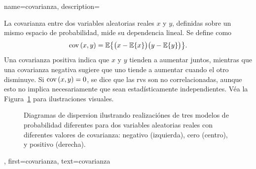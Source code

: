    {name={covarianza}, 
	description={La covarianza entre dos variables aleatorias reales $x$ y $y$, definidas sobre un mismo espacio de probabilidad, mide su dependencia lineal. Se define como 
			   $$
			   {\rm cov}\left(x,y\right) = \mathbb{E}\big\{ \big(x - \mathbb{E}\{ x\} \big)\big(y - \mathbb{E}\{y\} \big)\big\}.
			   $$
			   Una covarianza positiva indica que $x$ y $y$ tienden a aumentar juntos, mientras que una covarianza negativa sugiere que uno tiende a aumentar cuando el otro disminuye. Si ${\rm cov}\left(x,y\right) = 0$, se dice que las \glspl{rv} son no correlacionadas, aunque esto no implica necesariamente que sean estadísticamente independientes. Véa la Figura~\ref{fig:covariance-examples_dict} para ilustraciones visuales.
		   \begin{figure}[H]
			   \caption{Diagramas de dispersion ilustrando realizaciónes de tres modelos de probabilidad diferentes para dos
				  variables aleatorias reales con diferentes valores de covarianza: negativo (izquierda), cero (centro), y positivo (derecha).}
			   \label{fig:covariance-examples_dict}
		   \end{figure}
		   },
	   first={covarianza},
	   text={covarianza} 
   }


